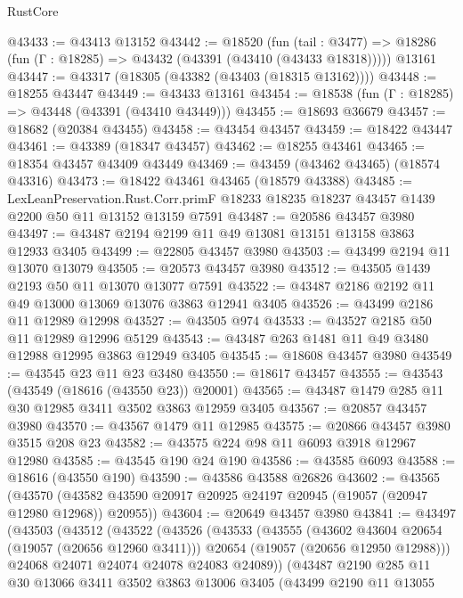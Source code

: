 \begin{lexlean}{RustCore}
\begin{coremodule}
@43433 := @43413 @13152
@43442 := @18520
    (fun (tail : @3477) => @18286 (fun (Γ : @18285) => @43432 (@43391 (@43410 (@43433 @18318)))))
    @13161
@43447 := @43317 (@18305 (@43382 (@43403 (@18315 @13162))))
@43448 := @18255 @43447
@43449 := @43433 @13161
@43454 := @18538 (fun (Γ : @18285) => @43448 (@43391 (@43410 @43449)))
@43455 := @18693 @36679
@43457 := @18682 (@20384 @43455)
@43458 := @43454 @43457
@43459 := @18422 @43447
@43461 := @43389 (@18347 @43457)
@43462 := @18255 @43461
@43465 := @18354 @43457 @43409 @43449
@43469 := @43459 (@43462 @43465) (@18574 @43316)
@43473 := @18422 @43461 @43465 (@18579 @43388)
@43485 := LexLeanPreservation.Rust.Corr.primF
    @18233
    @18235
    @18237
    @43457
    @1439
    @2200
    @50
    @11
    @13152
    @13159
    @7591
@43487 := @20586 @43457 @3980
@43497 := @43487 @2194 @2199 @11 @49 @13081 @13151 @13158 @3863 @12933 @3405
@43499 := @22805 @43457 @3980
@43503 := @43499 @2194 @11 @13070 @13079
@43505 := @20573 @43457 @3980
@43512 := @43505 @1439 @2193 @50 @11 @13070 @13077 @7591
@43522 := @43487 @2186 @2192 @11 @49 @13000 @13069 @13076 @3863 @12941 @3405
@43526 := @43499 @2186 @11 @12989 @12998
@43527 := @43505 @974
@43533 := @43527 @2185 @50 @11 @12989 @12996 @5129
@43543 := @43487 @263 @1481 @11 @49 @3480 @12988 @12995 @3863 @12949 @3405
@43545 := @18608 @43457 @3980
@43549 := @43545 @23 @11 @23 @3480
@43550 := @18617 @43457
@43555 := @43543 (@43549 (@18616 (@43550 @23)) @20001)
@43565 := @43487 @1479 @285 @11 @30 @12985 @3411 @3502 @3863 @12959 @3405
@43567 := @20857 @43457 @3980
@43570 := @43567 @1479 @11 @12985
@43575 := @20866 @43457 @3980 @3515 @208 @23
@43582 := @43575 @224 @98 @11 @6093 @3918 @12967 @12980
@43585 := @43545 @190 @24 @190
@43586 := @43585 @6093
@43588 := @18616 (@43550 @190)
@43590 := @43586 @43588 @26826
@43602 := @43565
    (@43570 (@43582 @43590 @20917 @20925 @24197 @20945 (@19057 (@20947 @12980 @12968)) @20955))
@43604 := @20649 @43457 @3980
@43841 := @43497
    (@43503
      (@43512
        (@43522
          (@43526
            (@43533
              (@43555
                (@43602 @43604 @20654 (@19057 (@20656 @12960 @3411)))
                @20654
                (@19057 (@20656 @12950 @12988)))
              @24068
              @24071
              @24074
              @24078
              @24083
              @24089))
          (@43487
            @2190
            @285
            @11
            @30
            @13066
            @3411
            @3502
            @3863
            @13006
            @3405
            (@43499
              @2190
              @11
              @13055

\end{coremodule}
\end{lexlean}
